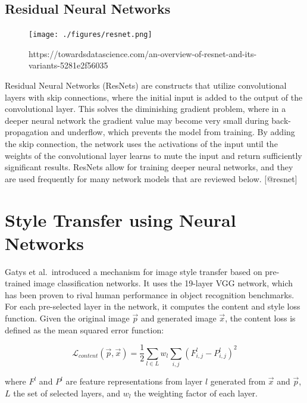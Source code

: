 \documentclass[12pt,a4paper,]{report}
\begin{document}
\hypertarget{residual-neural-networks}{%
\subsection{Residual Neural Networks}\label{residual-neural-networks}}

\begin{figure}[h]
    \texttt{[image: ./figures/resnet.png]}
    \centering
    \caption{https://towardsdatascience.com/an-overview-of-resnet-and-its-variants-5281e2f56035}
\end{figure}

Residual Neural Networks (ResNets) are constructs that utilize
convolutional layers with skip connections, where the initial input is
added to the output of the convolutional layer. This solves the
diminishing gradient problem, where in a deeper neural network the
gradient value may become very small during back-propagation and
underflow, which prevents the model from training. By adding the skip
connection, the network uses the activations of the input until the
weights of the convolutional layer learns to mute the input and return
sufficiently significant results. ResNets allow for training deeper
neural networks, and they are used frequently for many network models
that are reviewed below. {[}@resnet{]}

\hypertarget{style-transfer-using-neural-networks}{%
\section{Style Transfer using Neural
Networks}\label{style-transfer-using-neural-networks}}

Gatys et al.~introduced a mechanism for image style transfer based on
pre-trained image classification networks. It uses the 19-layer VGG
network, which has been proven to rival human performance in object
recognition benchmarks. For each pre-selected layer in the network, it
computes the content and style loss function. Given the original image
\(\vec{p}\) and generated image \(\vec{x}\), the content loss is defined
as the mean squared error function:

\begin{equation}
    \mathcal{L}_{content}(\vec{p}, \vec{x}) = \frac{1}{2} \sum_{l \in L} w_l \sum_{i,j} (F^l_{i, j} - P^l_{i, j})^2
\end{equation}

where \(F^l\) and \(P^l\) are feature representations from layer \(l\)
generated from \(\vec{x}\) and \(\vec{p}\), \(L\) the set of selected
layers, and \(w_l\) the weighting factor of each layer.
\end{document}
